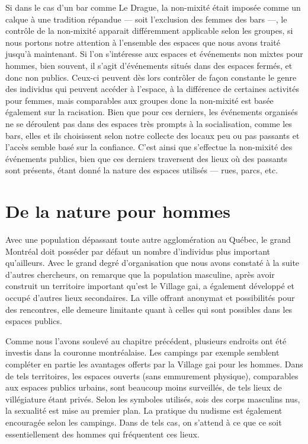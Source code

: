 Si dans le cas d'un bar comme Le Drague, la non-mixité était imposée comme un calque à une tradition répandue --- soit l'exclusion des femmes des bars ---, le contrôle de la non-mixité apparait différemment applicable selon les groupes, si nous portons notre attention à l'ensemble des espaces que nous avons traité jusqu'à maintenant.
Si l'on s'intéresse aux espaces et événements non mixtes pour hommes, bien souvent, il s'agit d'événements situés dans des espaces fermés, et donc non publics.
Ceux-ci peuvent dès lors contrôler de façon constante le genre des individus qui peuvent accéder à l'espace, à la différence de certaines activités pour femmes, mais comparables aux groupes donc la non-mixité est basée également sur la racisation.
Bien que pour ces derniers, les événements organisés ne se déroulent pas dans des espaces très prompts à la socialisation, comme les bars, elles et ils choisissent selon notre collecte des locaux peu ou pas passants et l'accès semble basé sur la confiance.
C'est ainsi que s'effectue la non-mixité des événements publics, bien que ces derniers traversent des lieux où des passants sont présents, étant donné la nature des espaces utilisés --- rues, parcs, etc.

\section{De la nature pour hommes}
\label{sec:de_la_nature_pour_hommes}
Avec une population dépassant toute autre agglomération au Québec, le grand Montréal doit posséder par défaut un nombre d'individus \lgbt{} plus important qu'ailleurs.
Avec le grand degré d'organisation que nous avons constaté à la suite d'autres chercheurs, on remarque que la population masculine, après avoir construit un territoire important qu'est le Village gai, a également développé et occupé d'autres lieux secondaires.
La ville offrant anonymat et possibilités pour des rencontres, elle demeure limitante quant à celles qui sont possibles dans les espaces publics.

Comme nous l'avons soulevé au chapitre précédent, plusieurs endroits ont été investis dans la couronne montréalaise.
Les campings par exemple semblent compléter en partie les avantages offerts par la Village gai pour les hommes.
Dans de tels territoires, les espaces ouverts (sans emmurement physique), comparables aux espaces publics urbains, sont beaucoup moins surveillés, de tels lieux de villégiature étant  privés.
Selon les symboles utilisés, sois des corps masculins nus, la sexualité est mise au premier plan.
La pratique du nudisme est également encouragée selon les campings.
Dans de tels cas, on s'attend à ce que ce soit essentiellement des hommes qui fréquentent ces lieux.

